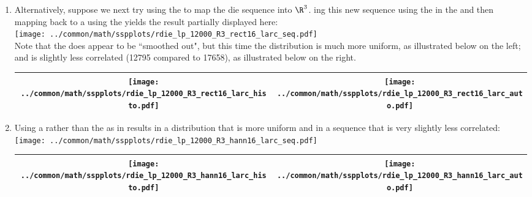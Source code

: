\begin{example}
\begin{enumerate}
  \item \label{item:rdie_lp_R3_rect16_larc}
        Alternatively, suppose we next try
        using the  
        to map the die sequence into $\R^3$.
        ing %
        this new sequence using the 
        in the   
        and then mapping back to a  %
        using the  yields the result partially displayed here:
        \\\texttt{[image: ../common/math/sspplots/rdie\_lp\_12000\_R3\_rect16\_larc\_seq.pdf]}\\
        Note that the  does appear to be ``smoothed out", 
        but this time the distribution is much more uniform, as illustrated below on the left;
        and is slightly less correlated (12795 compared to 17658), as illustrated below on the right.
     \\\begin{tabular}{|>{\scs}c|>{\scs}c|}
          \hline
          \texttt{[image: ../common/math/sspplots/rdie\_lp\_12000\_R3\_rect16\_larc\_histo.pdf]}%
         &\texttt{[image: ../common/math/sspplots/rdie\_lp\_12000\_R3\_rect16\_larc\_auto.pdf]}
        \\\hline
     \end{tabular}
        

  \item \label{item:rdie_lp_R3_hann16_larc}
        Using a  
        rather than the  as in 
        results in a distribution that is more uniform and in a sequence that is very slightly less correlated:
        \\\texttt{[image: ../common/math/sspplots/rdie\_lp\_12000\_R3\_hann16\_larc\_seq.pdf]}
     \\\begin{tabular}{|>{\scs}c|>{\scs}c|}
          \hline
          \texttt{[image: ../common/math/sspplots/rdie\_lp\_12000\_R3\_hann16\_larc\_histo.pdf]}%
         &\texttt{[image: ../common/math/sspplots/rdie\_lp\_12000\_R3\_hann16\_larc\_auto.pdf]}
        \\\hline
     \end{tabular}


\end{enumerate}
\end{example}
